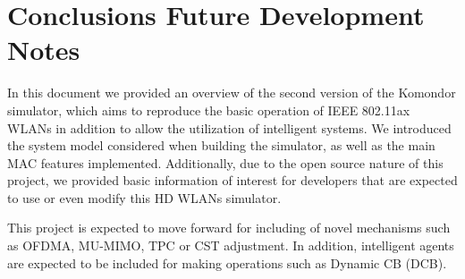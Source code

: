 \documentclass[a4paper]{article}
\begin{document}
\section{Conclusions Future Development Notes}
\label{section:conclusions}

In this document we provided an overview of the second version of the Komondor simulator, which aims to reproduce the basic operation of IEEE 802.11ax WLANs in addition to allow the utilization of intelligent systems. We introduced the system model considered when building the simulator, as well as the main MAC features implemented. Additionally, due to the open source nature of this project, we provided basic information of interest for developers that are expected to use or even modify this HD WLANs simulator.

This project is expected to move forward for including of novel mechanisms such as OFDMA, MU-MIMO, TPC or  CST adjustment. In addition, intelligent agents are expected to be included for making operations such as Dynamic CB (DCB).



\end{document}
